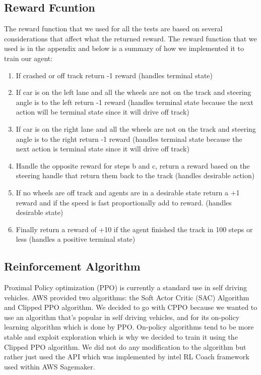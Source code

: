 \documentclass[journal]{IEEEtran}
\begin{document}
\subsection{Reward Fcuntion}
The reward function that we used for all the tests are based on several considerations that affect what the returned reward.  The reward function that we used is in the appendix and below is a summary of how we implemented it to train our agent:

\begin{enumerate}
  \item If crashed or off track return -1 reward (handles terminal state)
  \item If car is on the left lane and all the wheels are not on the track and steering angle is to the left return -1 reward (handles terminal state because the next action will be terminal state since it will drive off track)
  \item If car is on the right lane and all the wheels are not on the track and steering angle is to the right return -1 reward (handles terminal state because the next action is terminal state since it will drive off track)
  \item Handle the opposite reward for steps b and c, return a reward based on the steering handle that return them back to the track (handles desirable action)
  \item If no wheels are off track and agents are in a desirable state return a +1 reward and if the speed is fast proportionally add to reward. (handles desirable state)
  \item Finally return  a reward of +10 if the agent finished the track in 100 steps or less (handles a positive terminal state)
\end{enumerate}

\subsection{Reinforcement Algorithm}
Proximal Policy optimization (PPO) is currently a standard use in self driving vehicles.  AWS provided two algorithms: the Soft Actor Critic (SAC) Algorithm and Clipped PPO algorithm.  We decided to go with CPPO because we wanted to use an algorithm that's popular in self driving vehicles, and for its on-policy learning algorithm which is done by PPO.  On-policy algorithms tend to be more stable and exploit exploration which is why we decided to train it using the Clipped PPO algorithm.  We did not do any modification to the algorithm but rather just used the API which was implemented by intel RL Coach framework used within AWS Sagemaker.
\end{document}
